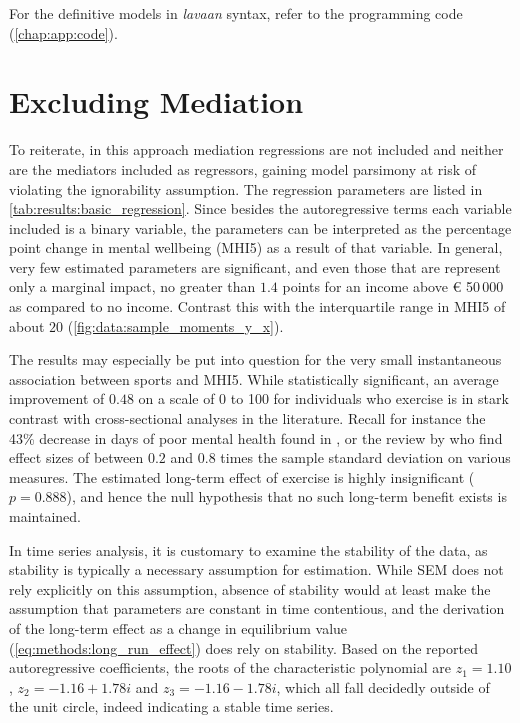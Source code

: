 For the definitive models in \textit{lavaan} syntax, refer to the programming code (\cref{chap:app:code}).

\section{Excluding Mediation}
\label{sec:results:no_mediation}

To reiterate, in this approach mediation regressions are not included and neither are the mediators included as regressors,
gaining model parsimony at risk of violating the ignorability assumption.
The regression parameters are listed in \cref{tab:results:basic_regression}. Since besides the autoregressive
terms each variable included is a binary variable, the parameters can be interpreted as the percentage point change
in mental wellbeing (MHI5) as a result of that variable.
In general, very few estimated parameters are significant, and even those that are represent only a marginal impact,
no greater than $1.4$ points for an income above € 50\,000 as compared to no income. Contrast this with the interquartile
range in MHI5 of about $20$ (\cref{fig:data:sample_moments_y_x}).


The results may especially be put into question for the very small instantaneous association between sports and MHI5.
While statistically significant, an average improvement of $0.48$ on a scale of 0 to 100 for individuals who exercise
is in stark contrast with cross-sectional analyses in the literature. Recall for instance the 43\% decrease in days of poor mental
health found in , or the review by  who find effect sizes of between
$0.2$ and $0.8$ times the sample standard deviation on various measures.
The estimated long-term effect of exercise is highly insignificant ($p = 0.888$), and hence the null hypothesis that
no such long-term benefit exists is maintained.

In time series analysis, it is customary to examine the stability of the data, as stability is typically a necessary
assumption for estimation. While SEM does not rely explicitly on this assumption, absence of stability would at least make the
assumption that parameters are constant in time contentious, and the derivation of the long-term effect as a change
in equilibrium value (\cref{eq:methods:long_run_effect}) does rely on stability.
Based on the reported autoregressive coefficients, the roots of the characteristic polynomial are $z_1 = 1.10$,
$z_2 = -1.16 + 1.78i$ and $z_3 = -1.16 - 1.78i$, which all fall decidedly outside of the unit circle,
indeed indicating a stable time series.

